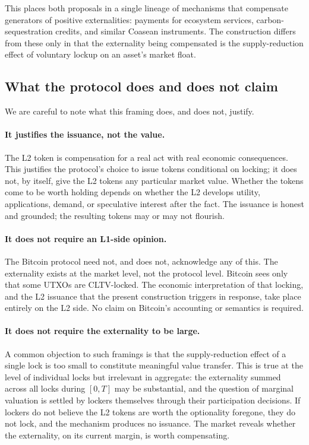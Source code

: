 \documentclass[11pt,a4paper]{article}
\begin{document}
This places both proposals in a single lineage of mechanisms that compensate generators of positive externalities: payments for ecosystem services, carbon-sequestration credits, and similar Coasean instruments. The construction differs from these only in that the externality being compensated is the supply-reduction effect of voluntary lockup on an asset's market float.

\subsection{What the protocol does and does not claim}

We are careful to note what this framing does, and does not, justify.

\paragraph{It justifies the issuance, not the value.} The L2 token is compensation for a real act with real economic consequences. This justifies the protocol's choice to issue tokens conditional on locking; it does not, by itself, give the L2 tokens any particular market value. Whether the tokens come to be worth holding depends on whether the L2 develops utility, applications, demand, or speculative interest after the fact. The issuance is honest and grounded; the resulting tokens may or may not flourish.

\paragraph{It does not require an L1-side opinion.} The Bitcoin protocol need not, and does not, acknowledge any of this. The externality exists at the market level, not the protocol level. Bitcoin sees only that some UTXOs are CLTV-locked. The economic interpretation of that locking, and the L2 issuance that the present construction triggers in response, take place entirely on the L2 side. No claim on Bitcoin's accounting or semantics is required.

\paragraph{It does not require the externality to be large.} A common objection to such framings is that the supply-reduction effect of a single lock is too small to constitute meaningful value transfer. This is true at the level of individual locks but irrelevant in aggregate: the externality summed across all locks during $[0, T]$ may be substantial, and the question of marginal valuation is settled by lockers themselves through their participation decisions. If lockers do not believe the L2 tokens are worth the optionality foregone, they do not lock, and the mechanism produces no issuance. The market reveals whether the externality, on its current margin, is worth compensating.
\end{document}
